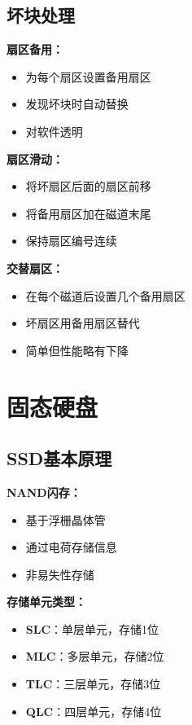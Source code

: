 \documentclass[lang=cn,newtx,10pt,scheme=chinese]{../../elegantbook}
\begin{document}
\subsection{坏块处理}

\textbf{扇区备用：}
\begin{itemize}
  \item 为每个扇区设置备用扇区
  \item 发现坏块时自动替换
  \item 对软件透明
\end{itemize}

\textbf{扇区滑动：}
\begin{itemize}
  \item 将坏扇区后面的扇区前移
  \item 将备用扇区加在磁道末尾
  \item 保持扇区编号连续
\end{itemize}

\textbf{交替扇区：}
\begin{itemize}
  \item 在每个磁道后设置几个备用扇区
  \item 坏扇区用备用扇区替代
  \item 简单但性能略有下降
\end{itemize}

\section{固态硬盘}

\subsection{SSD基本原理}

\textbf{NAND闪存：}
\begin{itemize}
  \item 基于浮栅晶体管
  \item 通过电荷存储信息
  \item 非易失性存储
\end{itemize}

\textbf{存储单元类型：}
\begin{itemize}
  \item \textbf{SLC}：单层单元，存储1位
  \item \textbf{MLC}：多层单元，存储2位
  \item \textbf{TLC}：三层单元，存储3位
  \item \textbf{QLC}：四层单元，存储4位
\end{itemize}
\end{document}
